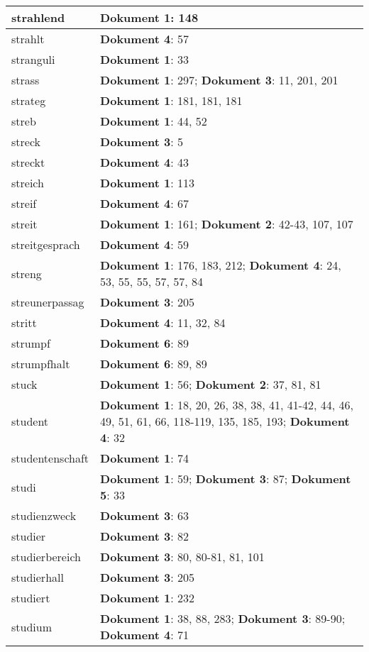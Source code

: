 \documentclass[a5paper]{article}
\begin{document}
\begin{longtable}[l]{|l|p{3in}|}
\hline
strahlend & \textbf{Dokument 1}: 148 \\
\hline
strahlt & \textbf{Dokument 4}: 57 \\
\hline
stranguli & \textbf{Dokument 1}: 33 \\
\hline
strass & \textbf{Dokument 1}: 297; \textbf{Dokument 3}: 11, 201, 201 \\
\hline
strateg & \textbf{Dokument 1}: 181, 181, 181 \\
\hline
streb & \textbf{Dokument 1}: 44, 52 \\
\hline
streck & \textbf{Dokument 3}: 5 \\
\hline
streckt & \textbf{Dokument 4}: 43 \\
\hline
streich & \textbf{Dokument 1}: 113 \\
\hline
streif & \textbf{Dokument 4}: 67 \\
\hline
streit & \textbf{Dokument 1}: 161; \textbf{Dokument 2}: 42-43, 107, 107 \\
\hline
streitgesprach & \textbf{Dokument 4}: 59 \\
\hline
streng & \textbf{Dokument 1}: 176, 183, 212; \textbf{Dokument 4}: 24, 53, 55, 55, 57, 57, 84 \\
\hline
streunerpassag & \textbf{Dokument 3}: 205 \\
\hline
stritt & \textbf{Dokument 4}: 11, 32, 84 \\
\hline
strumpf & \textbf{Dokument 6}: 89 \\
\hline
strumpfhalt & \textbf{Dokument 6}: 89, 89 \\
\hline
stuck & \textbf{Dokument 1}: 56; \textbf{Dokument 2}: 37, 81, 81 \\
\hline
student & \textbf{Dokument 1}: 18, 20, 26, 38, 38, 41, 41-42, 44, 46, 49, 51, 61, 66, 118-119, 135, 185, 193; \textbf{Dokument 4}: 32 \\
\hline
studentenschaft & \textbf{Dokument 1}: 74 \\
\hline
studi & \textbf{Dokument 1}: 59; \textbf{Dokument 3}: 87; \textbf{Dokument 5}: 33 \\
\hline
studienzweck & \textbf{Dokument 3}: 63 \\
\hline
studier & \textbf{Dokument 3}: 82 \\
\hline
studierbereich & \textbf{Dokument 3}: 80, 80-81, 81, 101 \\
\hline
studierhall & \textbf{Dokument 3}: 205 \\
\hline
studiert & \textbf{Dokument 1}: 232 \\
\hline
studium & \textbf{Dokument 1}: 38, 88, 283; \textbf{Dokument 3}: 89-90; \textbf{Dokument 4}: 71 \\

\end{longtable}
\end{document}
